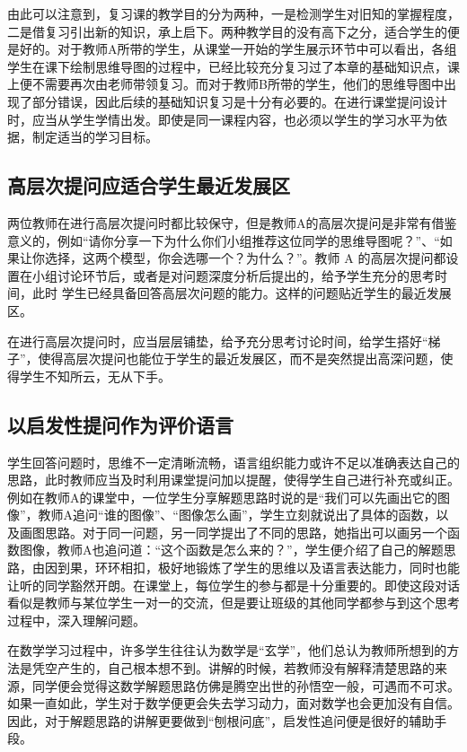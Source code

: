 由此可以注意到，复习课的教学目的分为两种，一是检测学生对旧知的掌握程度，二是借复习引出新的知识，承上启下。两种教学目的没有高下之分，适合学生的便是好的。对于教师A所带的学生，从课堂一开始的学生展示环节中可以看出，各组学生在课下绘制思维导图的过程中，已经比较充分复习过了本章的基础知识点，课上便不需要再次由老师带领复习。而对于教师B所带的学生，他们的思维导图中出现了部分错误，因此后续的基础知识复习是十分有必要的。在进行课堂提问设计时，应当从学生学情出发。即使是同一课程内容，也必须以学生的学习水平为依据，制定适当的学习目标。


\subsection{高层次提问应适合学生最近发展区}

两位教师在进行高层次提问时都比较保守，但是教师A的高层次提问是非常有借鉴意义的，例如“请你分享一下为什么你们小组推荐这位同学的思维导图呢？”、“如果让你选择，这两个模型，你会选哪一个？为什么？”。教师 A 的高层次提问都设置在小组讨论环节后，或者是对问题深度分析后提出的，给予学生充分的思考时间，此时 学生已经具备回答高层次问题的能力。这样的问题贴近学生的最近发展区。

在进行高层次提问时，应当层层铺垫，给予充分思考讨论时间，给学生搭好“梯子”，使得高层次提问也能位于学生的最近发展区，而不是突然提出高深问题，使得学生不知所云，无从下手。


\subsection{以启发性提问作为评价语言}

学生回答问题时，思维不一定清晰流畅，语言组织能力或许不足以准确表达自己的思路，此时教师应当及时利用课堂提问加以提醒，使得学生自己进行补充或纠正。例如在教师A的课堂中，一位学生分享解题思路时说的是“我们可以先画出它的图像”，教师A追问“谁的图像”、“图像怎么画”，学生立刻就说出了具体的函数，以及画图思路。对于同一问题，另一同学提出了不同的思路，她指出可以画另一个函数图像，教师A也追问道：“这个函数是怎么来的？”，学生便介绍了自己的解题思路，由因到果，环环相扣，极好地锻炼了学生的思维以及语言表达能力，同时也能让听的同学豁然开朗。在课堂上，每位学生的参与都是十分重要的。即使这段对话看似是教师与某位学生一对一的交流，但是要让班级的其他同学都参与到这个思考过程中，深入理解问题。

在数学学习过程中，许多学生往往认为数学是“玄学”，他们总认为教师所想到的方法是凭空产生的，自己根本想不到。讲解的时候，若教师没有解释清楚思路的来源，同学便会觉得这数学解题思路仿佛是腾空出世的孙悟空一般，可遇而不可求。如果一直如此，学生对于数学便更会失去学习动力，面对数学也会更加没有自信。因此，对于解题思路的讲解更要做到“刨根问底”，启发性追问便是很好的辅助手段。


